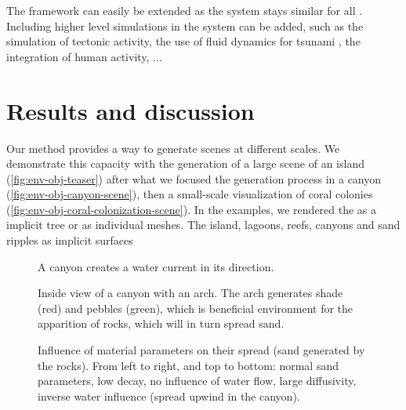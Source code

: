 \midConclusion

The framework can easily be extended as the  system stays similar for all . Including higher level simulations in the  system can be added, such as the simulation of tectonic activity, the use of fluid dynamics for tsunami , the integration of human activity, ...

\section{Results and discussion}
\label{sec:env-obj-results}
Our method provides a way to generate scenes at different scales. We demonstrate this capacity with the generation of a large scene of an island (\cref{fig:env-obj-teaser}) after what we focused the generation process in a canyon (\cref{fig:env-obj-canyon-scene}), then a small-scale visualization of coral colonies (\cref{fig:env-obj-coral-colonization-scene}).
In the examples, we rendered the  as a implicit tree or as individual meshes. The island, lagoons, reefs, canyons and sand ripples as implicit surfaces


\begin{figure}
    \caption{A canyon creates a water current in its direction. }
    \label{fig:env-obj-canyon-flow}
\end{figure}

\begin{figure}
    \caption{Inside view of a canyon with an arch. The arch generates shade (red) and pebbles (green), which is beneficial environment for the apparition of rocks, which will in turn spread sand. }
    \label{fig:env-obj-canyon-inside-with-arch}
\end{figure}

\begin{figure}
    \caption{Influence of material parameters on their spread (sand generated by the rocks). From left to right, and top to bottom: normal sand parameters, low decay, no influence of water flow, large diffusivity, inverse water influence (spread upwind in the canyon). }
    \label{fig:env-obj-material-diffusion-parameters}
\end{figure}

